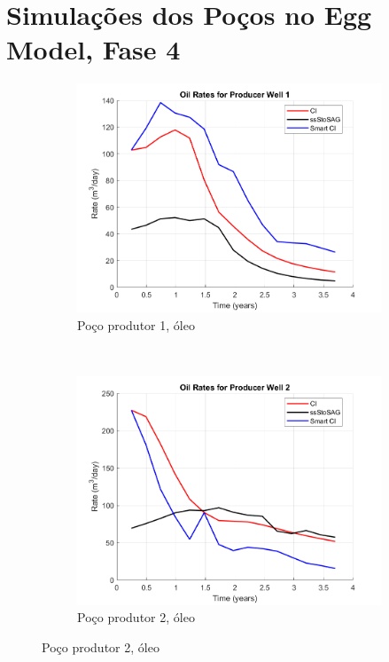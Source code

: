 \chapter{Simula\c{c}\~{o}es dos Po\c{c}os no Egg Model, Fase 4}\label{apn:egg4}

\begin{figure}[!ht]
	\centering
	\begin{subfigure}[b]{.3\textwidth}
		\includegraphics[width=\textwidth]{figs/resultadosEgg/imgsim4/EGG_OilWell1_Zoom}
		\caption{Po\c{c}o produtor 1, \'{o}leo}
		\label{EGG4_OilWell1}
	\end{subfigure}
	~
	\begin{subfigure}[b]{.3\textwidth}
		\includegraphics[width=\textwidth]{figs/resultadosEgg/imgsim4/EGG_OilWell2_Zoom}
		\caption{Po\c{c}o produtor 2, \'{o}leo}
		\label{EGG4_OilWell2}
	\end{subfigure}
	

\end{figure}

